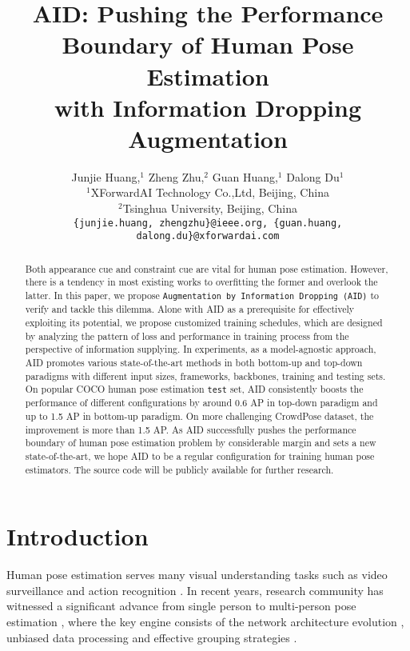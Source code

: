 \documentclass[final]{cvpr}
\begin{document}
\title{AID: Pushing the Performance Boundary of Human Pose Estimation \\ with Information Dropping Augmentation}

\author{Junjie Huang,$^1$ Zheng Zhu,$^2$ Guan Huang,$^1$ Dalong Du$^1$ \\
$^1$XForwardAI Technology Co.,Ltd, Beijing, China\\
$^2$Tsinghua University, Beijing, China\\
{\tt\small \{junjie.huang, zhengzhu\}@ieee.org, \{guan.huang, dalong.du\}@xforwardai.com}
}

\maketitle


\begin{abstract}
Both appearance cue and constraint cue are vital for human pose estimation. However, there is a tendency in most existing works to overfitting the former and overlook the latter. In this paper, we propose \texttt{Augmentation by Information Dropping (AID)} to verify and tackle this dilemma. Alone with AID as a prerequisite for effectively exploiting its potential, we propose customized training schedules, which are designed by analyzing the pattern of loss and performance in training process from the perspective of information supplying. In experiments, as a model-agnostic approach, AID promotes various state-of-the-art methods in both bottom-up and top-down paradigms with different input sizes, frameworks, backbones, training and testing sets. On popular COCO human pose estimation \texttt{test} set, AID consistently boosts the performance of different configurations by around 0.6 AP in top-down paradigm and up to 1.5 AP in bottom-up paradigm. On more challenging CrowdPose dataset, the improvement is more than 1.5 AP. As AID successfully pushes the performance boundary of human pose estimation problem by considerable margin and sets a new state-of-the-art, we hope AID to be a regular configuration for training human pose estimators. The source code will be publicly available for further research.
\end{abstract}

\section{Introduction}
Human pose estimation serves many visual understanding tasks such as video surveillance \cite{li2019state} and action recognition \cite{carreira2017quo, zhu2019action, zhu2019convolutional}. In recent years, research community has witnessed a significant advance from single person \cite{PS,DPM,DeepPose,tompson2014joint,CPM,Hourglass,fppose} to multi-person pose estimation \cite{DeepCut,DeeperCut,OpenPose,G-RMI,CPN,HRNet,AssociativeEmbedding,Higher}, where the key engine consists of the network architecture evolution \cite{CPN,SBNet,HRNet,MSPN,RSN}, unbiased data processing \cite{DARK,UDP} and effective grouping strategies \cite{DeepCut,DeeperCut,OpenPose,AssociativeEmbedding}.
\end{document}
